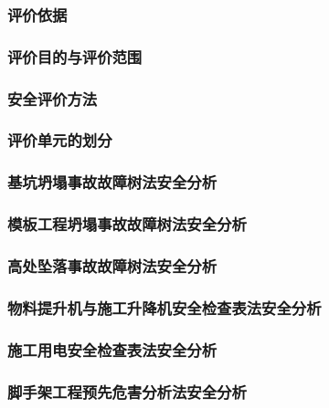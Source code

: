\subsubsection{评价依据}
\subsubsection{评价目的与评价范围}
\subsubsection{安全评价方法}
\subsubsection{评价单元的划分}
\subsubsection{基坑坍塌事故故障树法安全分析}
\subsubsection{模板工程坍塌事故故障树法安全分析}
\subsubsection{高处坠落事故故障树法安全分析}
\subsubsection{物料提升机与施工升降机安全检查表法安全分析}
\subsubsection{施工用电安全检查表法安全分析}
\subsubsection{脚手架工程预先危害分析法安全分析}
